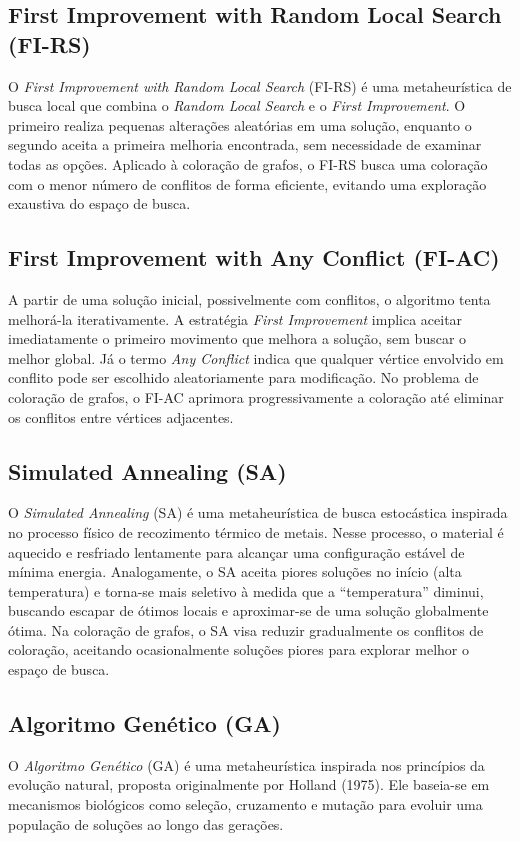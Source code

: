 \documentclass[12pt,a4paper]{article}
\begin{document}
\subsection{First Improvement with Random Local Search (FI-RS)}
O \textit{First Improvement with Random Local Search} (FI-RS) é uma metaheurística de busca local que combina o \textit{Random Local Search} e o \textit{First Improvement}.  
O primeiro realiza pequenas alterações aleatórias em uma solução, enquanto o segundo aceita a primeira melhoria encontrada, sem necessidade de examinar todas as opções.  
Aplicado à coloração de grafos, o FI-RS busca uma coloração com o menor número de conflitos de forma eficiente, evitando uma exploração exaustiva do espaço de busca.

\subsection{First Improvement with Any Conflict (FI-AC)}
A partir de uma solução inicial, possivelmente com conflitos, o algoritmo tenta melhorá-la iterativamente.  
A estratégia \textit{First Improvement} implica aceitar imediatamente o primeiro movimento que melhora a solução, sem buscar o melhor global. Já o termo \textit{Any Conflict} indica que qualquer vértice envolvido em conflito pode ser escolhido aleatoriamente para modificação.  
No problema de coloração de grafos, o FI-AC aprimora progressivamente a coloração até eliminar os conflitos entre vértices adjacentes.

\subsection{Simulated Annealing (SA)}
O \textit{Simulated Annealing} (SA) é uma metaheurística de busca estocástica inspirada no processo físico de recozimento térmico de metais. Nesse processo, o material é aquecido e resfriado lentamente para alcançar uma configuração estável de mínima energia.  
Analogamente, o SA aceita piores soluções no início (alta temperatura) e torna-se mais seletivo à medida que a “temperatura” diminui, buscando escapar de ótimos locais e aproximar-se de uma solução globalmente ótima.  
Na coloração de grafos, o SA visa reduzir gradualmente os conflitos de coloração, aceitando ocasionalmente soluções piores para explorar melhor o espaço de busca.

\subsection{Algoritmo Genético (GA)}
O \textit{Algoritmo Genético} (GA) é uma metaheurística inspirada nos princípios da evolução natural, proposta originalmente por Holland (1975). Ele baseia-se em mecanismos biológicos como seleção, cruzamento e mutação para evoluir uma população de soluções ao longo das gerações.
\end{document}
